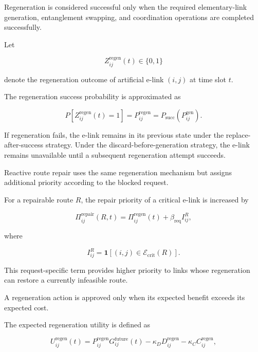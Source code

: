 Regeneration is considered successful only when the required elementary-link generation, entanglement swapping, and coordination operations are completed successfully.

Let

\begin{equation}
    Z_{ij}^{\mathrm{regen}}(t)
    \in
    \{0,1\}
\end{equation}

denote the regeneration outcome of artificial e-link $(i,j)$ at time slot $t$.

The regeneration success probability is approximated as

\begin{equation}
    P
    \left[
    Z_{ij}^{\mathrm{regen}}(t)=1
    \right]
    =
    P_{ij}^{\mathrm{regen}}
    =
    P_{\mathrm{succ}}
    \left(
    P_{ij}^{\mathrm{gen}}
    \right).
\end{equation}

If regeneration fails, the e-link remains in its previous state under the replace-after-success strategy. Under the discard-before-generation strategy, the e-link remains unavailable until a subsequent regeneration attempt succeeds.

Reactive route repair uses the same regeneration mechanism but assigns additional priority according to the blocked request.

For a repairable route $R$, the repair priority of a critical e-link is increased by

\begin{equation}
    \Pi_{ij}^{\mathrm{repair}}(R,t)
    =
    \Pi_{ij}^{\mathrm{regen}}(t)
    +
    \beta_{\mathrm{req}}
    I_{ij}^{R},
\end{equation}

where

\begin{equation}
    I_{ij}^{R}
    =
    \mathbf{1}
    \left[
    (i,j)
    \in
    \mathcal{E}_{\mathrm{crit}}(R)
    \right].
\end{equation}

This request-specific term provides higher priority to links whose regeneration can restore a currently infeasible route.

A regeneration action is approved only when its expected benefit exceeds its expected cost.

The expected regeneration utility is defined as

\begin{equation}
    U_{ij}^{\mathrm{regen}}(t)
    =
    P_{ij}^{\mathrm{regen}}
    G_{ij}^{\mathrm{future}}(t)
    -
    \kappa_D
    D_{ij}^{\mathrm{regen}}
    -
    \kappa_C
    C_{ij}^{\mathrm{regen}},
\end{equation}

